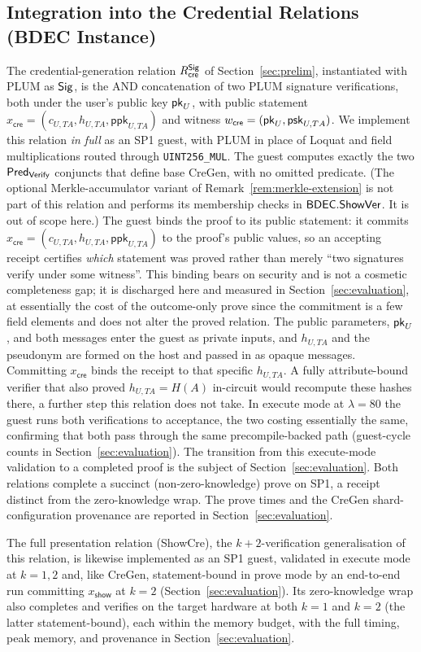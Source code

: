 \subsection{Integration into the Credential Relations (BDEC Instance)}\label{ssec:integration}
The credential-generation relation $R_{\mathsf{cre}}^{\mathsf{Sig}}$ of Section~\ref{sec:prelim}, instantiated with PLUM as $\mathsf{Sig}$, is the AND concatenation of two PLUM signature verifications, both under the user's public key $\mathsf{pk}_U$, with public statement $x_{\mathsf{cre}}=(c_{U,TA},h_{U,TA},\mathsf{ppk}_{U,TA})$ and witness $w_{\mathsf{cre}}=(\mathsf{pk}_U,\mathsf{psk}_{U,TA})$. We implement this relation \emph{in full} as an SP1 guest, with PLUM in place of Loquat and field multiplications routed through \texttt{UINT256\_MUL}. The guest computes exactly the two $\mathsf{Pred}_{\mathsf{Verify}}$ conjuncts that define base CreGen, with no omitted predicate. (The optional Merkle-accumulator variant of Remark~\ref{rem:merkle-extension} is not part of this relation and performs its membership checks in $\mathsf{BDEC}.\mathsf{ShowVer}$. It is out of scope here.) The guest binds the proof to its public statement: it commits $x_{\mathsf{cre}}=(c_{U,TA},h_{U,TA},\mathsf{ppk}_{U,TA})$ to the proof's public values, so an accepting receipt certifies \emph{which} statement was proved rather than merely ``two signatures verify under some witness''. This binding bears on security and is not a cosmetic completeness gap; it is discharged here and measured in Section~\ref{sec:evaluation}, at essentially the cost of the outcome-only prove since the commitment is a few field elements and does not alter the proved relation. The public parameters, $\mathsf{pk}_U$, and both messages enter the guest as private inputs, and $h_{U,TA}$ and the pseudonym are formed on the host and passed in as opaque messages. Committing $x_{\mathsf{cre}}$ binds the receipt to that specific $h_{U,TA}$. A fully attribute-bound verifier that also proved $h_{U,TA}=H(A)$ in-circuit would recompute these hashes there, a further step this relation does not take. In execute mode at $\lambda=80$ the guest runs both verifications to acceptance, the two costing essentially the same, confirming that both pass through the same precompile-backed path (guest-cycle counts in Section~\ref{sec:evaluation}). The transition from this execute-mode validation to a completed proof is the subject of Section~\ref{sec:evaluation}. Both relations complete a succinct (non-zero-knowledge) prove on SP1, a receipt distinct from the zero-knowledge wrap. The prove times and the CreGen shard-configuration provenance are reported in Section~\ref{sec:evaluation}.

The full presentation relation (ShowCre), the $k+2$-verification generalisation of this relation, is likewise implemented as an SP1 guest, validated in execute mode at $k=1,2$ and, like CreGen, statement-bound in prove mode by an end-to-end run committing $x_{\mathsf{show}}$ at $k=2$ (Section~\ref{sec:evaluation}). Its zero-knowledge wrap also completes and verifies on the target hardware at both $k=1$ and $k=2$ (the latter statement-bound), each within the memory budget, with the full timing, peak memory, and provenance in Section~\ref{sec:evaluation}.
